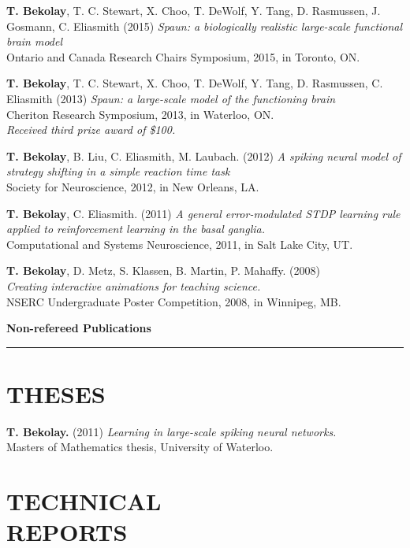 \documentclass[line,margin]{res}
\begin{document}
\begin{resume}
\textbf{T. Bekolay}, T. C. Stewart, X. Choo, T. DeWolf, Y. Tang,
D. Rasmussen, J. Gosmann, C. Eliasmith (2015)
  {\sl Spaun: a biologically realistic large-scale functional brain model} \\
  Ontario and Canada Research Chairs Symposium, 2015, in Toronto, ON.

\textbf{T. Bekolay}, T. C. Stewart, X. Choo, T. DeWolf, Y. Tang,
D. Rasmussen, C. Eliasmith (2013)
  {\sl Spaun: a large-scale model of the functioning brain} \\
  Cheriton Research Symposium, 2013, in Waterloo, ON. \\
  {\sl Received third prize award of \$100.}

\textbf{T. Bekolay}, B. Liu, C. Eliasmith, M. Laubach. (2012)
  {\sl A spiking neural model of strategy shifting in a simple
  reaction time task} \\
  Society for Neuroscience, 2012, in New Orleans, LA.

\textbf{T. Bekolay}, C. Eliasmith. (2011)
  {\sl A general error-modulated STDP learning rule applied to
  reinforcement learning in the basal ganglia.} \\
  Computational and Systems Neuroscience, 2011, in Salt Lake City, UT.

\textbf{T. Bekolay}, D. Metz, S. Klassen, B. Martin, P. Mahaffy. (2008) \\
  {\sl Creating interactive animations for teaching science.} \\
  NSERC Undergraduate Poster Competition, 2008, in Winnipeg, MB.
  \vspace{0.42em}

{\Large \bf Non-refereed Publications} \\ \vspace{-8pt} \hrule

\section{THESES}

\textbf{T. Bekolay.} (2011)
  {\sl Learning in large-scale spiking neural networks.} \\
  Masters of Mathematics thesis, University of Waterloo.

\section{TECHNICAL \\REPORTS}


\end{resume}
\end{document}
